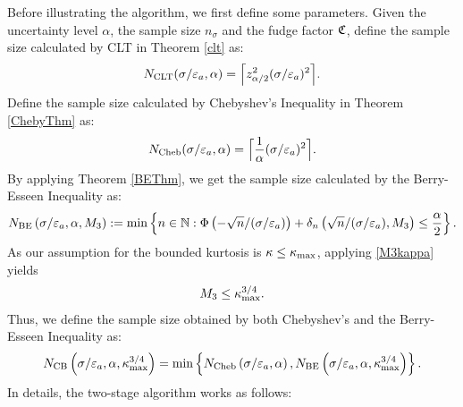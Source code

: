\documentclass{iitthesis}
\theoremstyle{definition}
\begin{document}
Before illustrating the algorithm, we first define some parameters. Given the uncertainty level $\alpha$, the sample size $n_{\sigma}$ and the fudge factor $\mathfrak{C}$, define the sample size calculated by CLT in Theorem \ref{clt} as:
\begin{equation}\label{NCLTmeanMCabsg}
N_{\text{CLT}}(\sigma/\varepsilon_a,\alpha)
= 
\Bigl\lceil
z_{\alpha/2}^2(\sigma/\varepsilon_a)^2
\Bigr\rceil.
\end{equation}
Define the sample size calculated by Chebyshev's Inequality in Theorem \ref{ChebyThm} as:
\begin{equation}\label{NChebymeanMCabsg}
N_{\text{Cheb}}(\sigma/\varepsilon_a,\alpha)
= 
\Bigl\lceil\frac{1}{\alpha}(\sigma/\varepsilon_a)^2\Bigr\rceil.
\end{equation}
By applying Theorem \ref{BEThm}, we get the sample size calculated by the Berry-Esseen Inequality as:
\begin{equation}\label{NBEmeanMCabsg}
N_{\text{BE}}\left(\sigma/\varepsilon_a,\alpha,M_3\right) := \min \left \{ n \in \mathbb{N} : \Phi\left(-\sqrt{n}/(\sigma/\varepsilon_a)\right)+\delta_n\left(\sqrt{n}/(\sigma/\varepsilon_a),M_3\right)
\le \frac{\alpha}{2} \right \}.
\end{equation}
As our assumption for the bounded kurtosis is $\kappa \leq \kappa_{\max}$, applying \eqref{M3kappa} yields 
\begin{align}\label{M3kmax}
M_3 \leq \kappa_{\max}^{3/4}.
\end{align}
Thus, we define the sample size obtained by both Chebyshev's and the Berry-Esseen Inequality as:
\begin{align}\label{NCBmeanMCabsg}
N_{\text{CB}} \left(\sigma/\varepsilon_a,\alpha, \kappa_{\max}^{3/4}\right)  = \min \left \{ N_{\text{Cheb}}\left(\sigma/\varepsilon_a,\alpha\right),N_{\text{BE}}\left(\sigma/\varepsilon_a,\alpha, \kappa_{\max}^{3/4}\right)\right \}.
\end{align}
In details, the two-stage algorithm works as follows:
\end{document}
